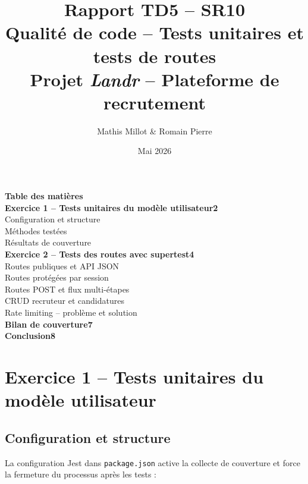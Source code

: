 \documentclass[12pt,a4paper]{article}
\title{\textbf{Rapport TD5 -- SR10}\\
\large Qualité de code -- Tests unitaires et tests de routes\\[4pt]
\normalsize Projet \textit{Landr} -- Plateforme de recrutement}
\author{Mathis Millot \& Romain Pierre}
\date{Mai 2026}
\begin{document}
\maketitle
\thispagestyle{empty}

{\large\bfseries Table des matières}\\[1em]
\noindent\textbf{Exercice 1 -- Tests unitaires du modèle utilisateur}\dotfill\textbf{2}\\[2pt]
\noindent\hspace{1.5em}Configuration et structure\\[2pt]
\noindent\hspace{1.5em}Méthodes testées\\[2pt]
\noindent\hspace{1.5em}Résultats de couverture\\[6pt]
\noindent\textbf{Exercice 2 -- Tests des routes avec supertest}\dotfill\textbf{4}\\[2pt]
\noindent\hspace{1.5em}Routes publiques et API JSON\\[2pt]
\noindent\hspace{1.5em}Routes protégées par session\\[2pt]
\noindent\hspace{1.5em}Routes POST et flux multi-étapes\\[2pt]
\noindent\hspace{1.5em}CRUD recruteur et candidatures\\[2pt]
\noindent\hspace{1.5em}Rate limiting -- problème et solution\\[6pt]
\noindent\textbf{Bilan de couverture}\dotfill\textbf{7}\\[6pt]
\noindent\textbf{Conclusion}\dotfill\textbf{8}
\newpage

\section{Exercice 1 -- Tests unitaires du modèle utilisateur}

\subsection{Configuration et structure}

La configuration Jest dans \texttt{package.json} active la collecte de couverture et force la fermeture du processus après les tests :
\end{document}
